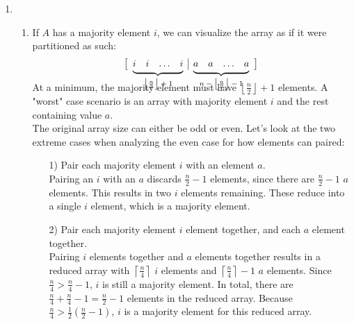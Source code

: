 \documentclass{article}
\newcommand\undermat[2]{%
  \makebox[0pt][l]{$\smash{\underbrace{\phantom{%
    \begin{matrix}#2\end{matrix}}}_{\text{$#1$}}}$}#2}
\begin{document}
\begin{enumerate}
\begin{enumerate}
            \item
                \begin{enumerate}
                    \item If $A$ has a majority element $i$, we can visualize the array as if it 
                    were partitioned as such:
                        \[
                            \left[
                                \begin{array}{cccc|cccc}
                                    \undermat{\left\lfloor\frac{n}{2}\right\rfloor + 1}{i & i & \ldots & i} & \undermat{n - \left\lfloor\frac{n}{2}\right\rfloor - 1}{a  & a & \ldots & a} \\
                                \end{array}
                            \right]
                        \]
                        \hfill \break
                        
                        At a minimum, the majority element must have $\left\lfloor\frac{n}{2}\right\rfloor + 1$ elements. A "worst" case scenario is an array with majority element $i$ and the rest containing value $a$. \\
                        
                        The original array size can either be odd or even. Let's look at the two extreme
                        cases when analyzing the even case for how elements can paired:
                        
                        \begin{enumerate}
                            \item[1)]  Pair each majority element $i$ with an element $a$. \\
                                Pairing an $i$ with an $a$ discards $\frac{n}{2} - 1$ elements, since there 
                                are $\frac{n}{2} - 1$ $a$ elements. This results in two $i$ elements remaining.
                                These reduce into a single $i$ element, which is a majority element.
                            \item[2)] Pair each majority element $i$ element together, and each $a$ element together. \\
                                Pairing $i$ elements together and $a$ elements together results in a reduced
                                array with $\left\lceil\frac{n}{4}\right\rceil$ $i$ elements and
                                $\left\lceil\frac{n}{4}\right\rceil - 1$ $a$ elements. 
                                Since $\frac{n}{4} > \frac{n}{4} - 1$, $i$ is still a majority element. 
                                In total, there are $\frac{n}{4} + \frac{n}{4} - 1 = \frac{n}{2} - 1$ 
                                elements in the reduced array. Because $\frac{n}{4} > \frac{1}{2}(\frac{n}{2} -
                                1)$, $i$ is  a majority element for this reduced array.
                        \end{enumerate}
                        

\end{enumerate}
\end{enumerate}
\end{enumerate}
\end{document}
